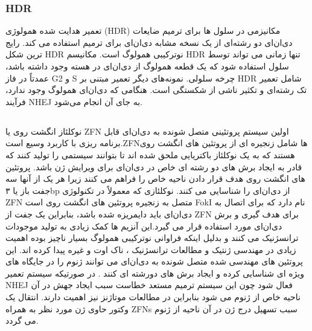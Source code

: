 \documentclass[12pt,a4paper,BCOR=.7cm,headsepline,bibliography=totoc]{report}
\begin{document}
\subsubsection{HDR}
 تعمیر هدایت شده همولوژی (HDR) مکانیزمی در سلول ها برای ترمیم ضایعات دی‌ان‌ای دو رشته‌ای از یک نسخه مشابه دی‌ان‌ای برای ترمیم استفاده می کند. رایج ترین شکل HDR نوترکیبی همولوگ است. مکانیسم HDR تنها زمانی می تواند توسط سلول استفاده شود که یک قطعه همولوگ از دی‌ان‌ای در هسته وجود داشته باشد، عمدتاً در فاز G2 و S چرخه سلولی. نمونه‌های دیگر تعمیر مبتنی بر HDR شامل تعمیر تک رشته‌ای و تکثیر ناشی از شکستگی است. هنگامی که دی‌ان‌ای همولوگ وجود ندارد، فرآیند NHEJ به جای آن انجام می‌شود.

\subsection{}

نوکلئاز انگشت روی یا ZFN اولین سیستم پروتئینی متصل شونده به دی‌ان‌ای قابل برنامه ریزی با کاربرد وسیع است.ZFNها شامل زنجیره ای از پروتئین های انگشت روی هستند که به یک نوکلئاز باکتریایی ملحق شده اند تا بتوانند سیستمی را تولید کنند که قادر به ایجاد برش های دو رشته ای خاص در دی‌ان‌ای برای ویرایش ژن باشد. پروتئین های انگشت روی هدف قرار دادن ناحیه خاص را فراهم می کنند زیرا هر یک از آنها سه جفت باز یا ۳bp از دی‌ان‌ای را شناسایی می کنند. نوکلئازی که معمولاً در تکنولوژی ZFN متصل به زنجیره پروتئین های انگشت روی است FokI نام دارد که برای اتصال به دی‌ان‌ای باید دایمریزه شده باشد، بنابراین یک جفت از ZFN برای هدف گیری و برش دی‌ان‌ای مورد استفاده قرار می گیرد.این آنزیم ها کمک زیادی به تولید موجودات ترانسژنیک می کنند و بدلیل اینکه فراوانی نوترکیبی همولوگ بسیار ناچیز بوده اهمیت زیادی در مهندسی ژنتیک و مطالعات ترانسژنیک ، ناک اوت و غیره پیدا کرده اند. این پروتئین های مهندسی شده متصل شونده به دی‌ان‌ای می توانند ژنوم را در جایگاه های ویژه ای شناسایی کرده و ایجاد برش های دورشته ای کنند . در صورتیکه سیستم تعمير NHEJ فعال شود چون این سیستم ترمیم مستعد خطاست سبب ایجاد جهش در آن ناحیه خاص از ژنوم می شود بنابراین در مطالعات موتاژنز نیز اهمیت دارند. انتقال یک وکتور حاوی ژن مورد نظر به همراه ZFNs سبب تسهیل درج ژن در آن ناحیه از ژنوم می گردد.
\end{document}
